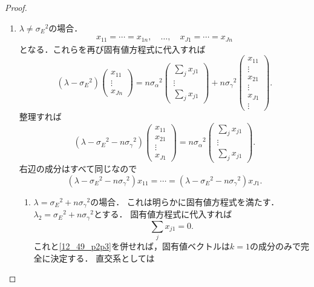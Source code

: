 \begin{proof}
\begin{enumerate}
    \item \(\lambda \neq \sigma_E{}^2\)の場合．
    \begin{align}
      x_{11} = \cdots = x_{1n} , \quad \ldots , \quad x_{J1} = \cdots = x_{Jn}
      \label{12_49_p2p3}
    \end{align}
    となる．これらを再び固有値方程式に代入すれば
    \[
    (\lambda - \sigma_E{}^2)
    \begin{pmatrix}
      x_{11} \\ \vdots \\ x_{Jn}
    \end{pmatrix}
    = n \sigma_\alpha{}^2
    \begin{pmatrix}
      \sum_{j} x_{j1} \\ \vdots \\ \sum_{j} x_{j1}
    \end{pmatrix}
    +
    n \sigma_\gamma{}^2
    \begin{pmatrix}
      x_{11} \\ \vdots \\ x_{21} \\ \vdots \\ x_{J1} \\ \vdots
    \end{pmatrix}
    .
    \]
    整理すれば
    \[
    (\lambda - \sigma_E{}^2 - n \sigma_\gamma{}^2)
    \begin{pmatrix}
      x_{11} \\ x_{21} \\ \vdots \\ x_{J1}
    \end{pmatrix}
    =  n \sigma_\alpha{}^2
    \begin{pmatrix}
      \sum_{j} x_{j1} \\ \vdots \\ \sum_{j} x_{j1}
    \end{pmatrix}
    .
    \]
    右辺の成分はすべて同じなので
    \[
    (\lambda - \sigma_E{}^2 - n \sigma_\gamma{}^2) x_{11} = \cdots = (\lambda - \sigma_E{}^2 - n \sigma_\gamma{}^2) x_{J1} .
    \]
    \begin{enumerate}
      \item \(\lambda = \sigma_E{}^2 + n \sigma_\gamma{}^2\)の場合．
      これは明らかに固有値方程式を満たす．
      \(\lambda_2 = \sigma_E{}^2 + n \sigma_\gamma{}^2\)とする．
      固有値方程式に代入すれば
      \[ \sum_j x_{j1} = 0 . \]
      これと\eqref{12_49_p2p3}を併せれば，固有値ベクトルは\(k=1\)の成分のみで完全に決定する．
      直交系としては
      \[
\]
\end{enumerate}
\end{enumerate}
\end{proof}
